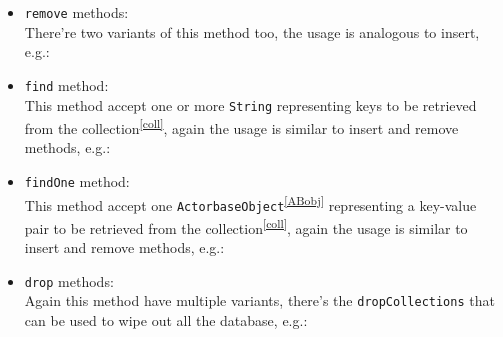 \documentclass{scalatekids-article}
\begin{document}
\begin{itemize}
\item \verb=remove= methods:\\ There're two variants of this method too, the usage is
  analogous to insert, e.g.:
\item \verb=find= method:\\ This method accept one or more \verb=String= representing
  keys to be retrieved from the collection\textsuperscript{\ref{coll}}, again the usage is similar to insert and
  remove methods, e.g.:
\item \verb=findOne= method:\\ This method accept one \verb=ActorbaseObject=\textsuperscript{\ref{ABobj}} representing
  a key-value pair to be retrieved from the collection\textsuperscript{\ref{coll}}, again the usage is similar to insert and
  remove methods, e.g.:
\item \verb=drop= methods:\\ Again this method have multiple variants, there's the
  \verb=dropCollections= that can be used to wipe out all the database, e.g.:

\end{itemize}
\end{document}
